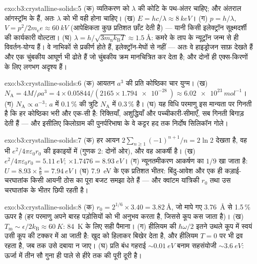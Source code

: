\begin{solution}{exo:b3:crystalline-solids:5}
(क) व्यतिकरण को $\lambda$ की कोटि के पथ-अंतर चाहिए; और अंतराल
आंगस्ट्रॉम के हैं, अतः $\lambda$ को भी वही होना चाहिए। (ख) $E =
hc/\lambda \approx \qty{8}{keV}$। (ग) $p = h/\lambda$, $V =
p^2/2m_{\text{e}}e \approx \qty{60}{kV}$ (आपेक्षिकता कुछ प्रतिशत
छाँट देती है) --- यानी किसी इलेक्ट्रॉन सूक्ष्मदर्शी की कार्यकारी
वोल्टता। (घ)
$\lambda = h/\sqrt{3m_{\text{n}}k_{\text{B}}T} \approx
\qty{1.5}{\angstrom}$: कमरे के ताप के न्यूट्रॉन जन्म से ही
विवर्तन-योग्य हैं। वे नाभिकों से प्रकीर्ण होते हैं, इलेक्ट्रॉन-मेघों
से नहीं --- अतः वे हाइड्रोजन साफ़ देखते हैं और एक चुंबकीय आघूर्ण भी
ढोते हैं जो चुंबकीय क्रम मानचित्रित कर देता है; और दोनों ही
एक्स-किरणों के लिए लगभग अदृश्य हैं।
\end{solution}

\begin{solution}{exo:b3:crystalline-solids:6}
(क) आयतन $a^3$ की प्रति कोष्ठिका चार युग्म। (ख) $N_{\text{A}} =
4M/\rho a^3 = 4\times0.05844/(2165\times\qty{1.794e-28}{})
\approx \qty{6.02e23}{mol^{-1}}$। (ग) $N_{\text{A}} \propto
a^{-3}$: $a$ में 0.1\,\% की त्रुटि $N_{\text{A}}$ में 0.3\,\% है। (घ)
यह विधि परमाणु इस मान्यता पर गिनती है कि हर कोष्ठिका भरी और एक-सी है:
रिक्तियाँ, अशुद्धियाँ और पच्चीकारी-सीमाएँ, सब गिनती बिगाड़ देती हैं
--- और इसीलिए किलोग्राम की पुनर्परिभाषा के वे कट्टर हद तक निर्दोष
सिलिकॉन गोले।
\end{solution}

\begin{solution}{exo:b3:crystalline-solids:7}
(क) हर आयन $2\sum_{n\ge1}(-1)^{n+1}/n = 2\ln2$ देखता है, वह भी
$e^2/4\pi\varepsilon_0r_0$ की इकाइयों में (गुणक 2: दोनों ओर), और
वह आकर्षी है। (ख)
$e^2/4\pi\varepsilon_0r_0 = \qty{5.11}{eV}$; $\times1.7476 =
\qty{8.93}{eV}$। (ग) न्यूनतमीकरण आकर्षण का $1/9$ खा जाता है:
$U = 8.93\times\tfrac89 = \qty{7.94}{eV}$। (घ) \qty{7.9}{eV} के एक
प्रतिशत भीतर: बिंदु-आवेश  और एक ही कड़ाई-चरघातांक
किसी आयनी ठोस का पूरा बजट समझा देते हैं --- और क्वांटम
यांत्रिकी $r_0$ तथा उस चरघातांक के भीतर छिपी रहती है।
\end{solution}

\begin{solution}{exo:b3:crystalline-solids:8}
(क) $r_0 = 2^{1/6}\times3.40 = \qty{3.82}{\angstrom}$, जो मापे गए
\qty{3.76}{\angstrom} से 1.5\,\% ऊपर है (हर परमाणु अपने बारह
पड़ोसियों को भी अनुभव करता है, जिससे कूप कस जाता है)। (ख)
$T_{\text{m}} \sim \epsilon/2k_{\text{B}} \approx \qty{60}{K}$:
\qty{84}{K} के लिए सही पैमाना। (ग) हीलियम की 
$\hbar\omega/2$ इतने उथले कूप में स्वयं उसी कूप की टक्कर में आ जाती
है:  खुद को हिलाकर बिखेर देता है, और हीलियम $T = 0$ पर भी
द्रव रहता है, जब तक उसे दबाया न जाए। (घ) प्रति बंध गहराई
$\sim\qty{0.01}{eV}$ बनाम सहसंयोजी
$\sim\qty{3.6}{eV}$: ऊर्जा में तीन सौ गुना ही पाले से हीरे तक की
पूरी दूरी है।
\end{solution}


